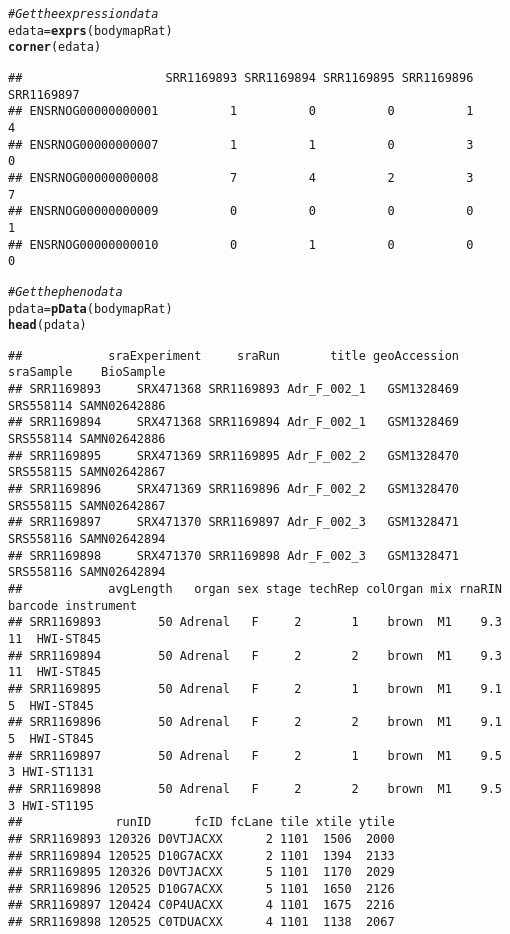 \documentclass{article}\usepackage[]{graphicx}\usepackage[usenames,dvipsnames]{color}
\makeatletter
\newcommand{\hlcom}[1]{\textcolor[rgb]{0.678,0.584,0.686}{\textit{#1}}}%
\newcommand{\hlstd}[1]{\textcolor[rgb]{0.345,0.345,0.345}{#1}}%
\newcommand{\hlkwb}[1]{\textcolor[rgb]{0.69,0.353,0.396}{#1}}%
\newcommand{\hlkwd}[1]{\textcolor[rgb]{0.737,0.353,0.396}{\textbf{#1}}}%
\newenvironment{kframe}{%
 \def\at@end@of@kframe{}%
 \ifinner\ifhmode%
  \def\at@end@of@kframe{\end{minipage}}%
  \begin{minipage}{\columnwidth}%
 \fi\fi%
 \def\FrameCommand##1{\hskip\@totalleftmargin \hskip-\fboxsep
 \colorbox{shadecolor}{##1}\hskip-\fboxsep
     \hskip-\linewidth \hskip-\@totalleftmargin \hskip\columnwidth}%
 \MakeFramed {\advance\hsize-\width
   \@totalleftmargin\z@ \linewidth\hsize
   \@setminipage}}%
 {\par\unskip\endMakeFramed%
 \at@end@of@kframe}
\newenvironment{knitrout}{}{} %
\makeatother
\begin{document}
\begin{knitrout}
\begin{kframe}
\begin{alltt}
\hlcom{# Get the expression data}
\hlstd{edata} \hlkwb{=} \hlkwd{exprs}\hlstd{(bodymapRat)}
\hlkwd{corner}\hlstd{(edata)}
\end{alltt}
\begin{verbatim}
##                    SRR1169893 SRR1169894 SRR1169895 SRR1169896 SRR1169897
## ENSRNOG00000000001          1          0          0          1          4
## ENSRNOG00000000007          1          1          0          3          0
## ENSRNOG00000000008          7          4          2          3          7
## ENSRNOG00000000009          0          0          0          0          1
## ENSRNOG00000000010          0          1          0          0          0
\end{verbatim}
\begin{alltt}
\hlcom{# Get the pheno data}
\hlstd{pdata} \hlkwb{=} \hlkwd{pData}\hlstd{(bodymapRat)}
\hlkwd{head}\hlstd{(pdata)}
\end{alltt}
\begin{verbatim}
##            sraExperiment     sraRun       title geoAccession sraSample    BioSample
## SRR1169893     SRX471368 SRR1169893 Adr_F_002_1   GSM1328469 SRS558114 SAMN02642886
## SRR1169894     SRX471368 SRR1169894 Adr_F_002_1   GSM1328469 SRS558114 SAMN02642886
## SRR1169895     SRX471369 SRR1169895 Adr_F_002_2   GSM1328470 SRS558115 SAMN02642867
## SRR1169896     SRX471369 SRR1169896 Adr_F_002_2   GSM1328470 SRS558115 SAMN02642867
## SRR1169897     SRX471370 SRR1169897 Adr_F_002_3   GSM1328471 SRS558116 SAMN02642894
## SRR1169898     SRX471370 SRR1169898 Adr_F_002_3   GSM1328471 SRS558116 SAMN02642894
##            avgLength   organ sex stage techRep colOrgan mix rnaRIN barcode instrument
## SRR1169893        50 Adrenal   F     2       1    brown  M1    9.3      11  HWI-ST845
## SRR1169894        50 Adrenal   F     2       2    brown  M1    9.3      11  HWI-ST845
## SRR1169895        50 Adrenal   F     2       1    brown  M1    9.1       5  HWI-ST845
## SRR1169896        50 Adrenal   F     2       2    brown  M1    9.1       5  HWI-ST845
## SRR1169897        50 Adrenal   F     2       1    brown  M1    9.5       3 HWI-ST1131
## SRR1169898        50 Adrenal   F     2       2    brown  M1    9.5       3 HWI-ST1195
##             runID      fcID fcLane tile xtile ytile
## SRR1169893 120326 D0VTJACXX      2 1101  1506  2000
## SRR1169894 120525 D10G7ACXX      2 1101  1394  2133
## SRR1169895 120326 D0VTJACXX      5 1101  1170  2029
## SRR1169896 120525 D10G7ACXX      5 1101  1650  2126
## SRR1169897 120424 C0P4UACXX      4 1101  1675  2216
## SRR1169898 120525 C0TDUACXX      4 1101  1138  2067
\end{verbatim}
\end{kframe}
\end{knitrout}
\end{document}
